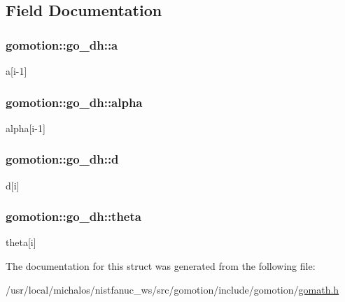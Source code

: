 \subsection{Field Documentation}
\hypertarget{structgomotion_1_1go__dh_a7c0eb988be1174d9e399e1d879289cde}{
\subsubsection[{a}]{ gomotion\-::go\-\_\-dh\-::a}}\label{structgomotion_1_1go__dh_a7c0eb988be1174d9e399e1d879289cde}
a\mbox{[}i-\/1\mbox{]} \hypertarget{structgomotion_1_1go__dh_a46264c283e1edf0b1195abf35f537e5c}{
\subsubsection[{alpha}]{ gomotion\-::go\-\_\-dh\-::alpha}}\label{structgomotion_1_1go__dh_a46264c283e1edf0b1195abf35f537e5c}
alpha\mbox{[}i-\/1\mbox{]} \hypertarget{structgomotion_1_1go__dh_a7ab3aa958eb98cc5e3b2b0953d7d567f}{
\subsubsection[{d}]{ gomotion\-::go\-\_\-dh\-::d}}\label{structgomotion_1_1go__dh_a7ab3aa958eb98cc5e3b2b0953d7d567f}
d\mbox{[}i\mbox{]} \hypertarget{structgomotion_1_1go__dh_a36e042da533df4bc583d8d8e26997111}{
\subsubsection[{theta}]{ gomotion\-::go\-\_\-dh\-::theta}}\label{structgomotion_1_1go__dh_a36e042da533df4bc583d8d8e26997111}
theta\mbox{[}i\mbox{]} 

The documentation for this struct was generated from the following file\-:\begin{DoxyCompactItemize}
\item 
/usr/local/michalos/nistfanuc\-\_\-ws/src/gomotion/include/gomotion/\hyperlink{gomath_8h}{gomath.\-h}\end{DoxyCompactItemize}

